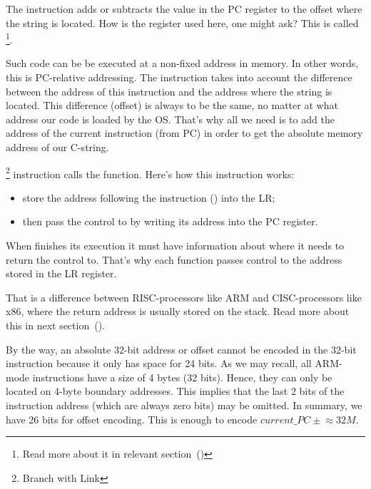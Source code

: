 \myindex{\PICcode}
The 
instruction adds or subtracts the value in the \ac{PC} register to the offset where the  string is located.
How is the  register used here, one might ask?
This is called \q{\PICcode}\footnote{Read more about it in relevant section~()}.

Such code can be be executed at a non-fixed address in memory.
In other words, this is \ac{PC}-relative addressing.
The  instruction takes into account the difference between the address of this instruction and the address where the string is located.
This difference (offset) is always to be the same, no matter at what address our code is loaded by the \ac{OS}.
That's why all we need is to add the address of the current instruction (from \ac{PC}) in order to get the absolute memory address of our C-string.

\footnote{Branch with Link} instruction calls the \printf function. 
Here's how this instruction works: 

\begin{itemize}
\item store the address following the  instruction () into the \ac{LR};
\item then pass the control to \printf by writing its address into the \ac{PC} register.
\end{itemize}

When \printf finishes its execution it must have information about where it needs to return the control to.
That's why each function passes control to the address stored in the \ac{LR} register.

That is a difference between  \ac{RISC}-processors like ARM and \ac{CISC}-processors like x86,
where the return address is usually stored on the stack.
Read more about this in next section~().

By the way, an absolute 32-bit address or offset cannot be encoded in the 32-bit  instruction because
it only has space for 24 bits.
As we may recall, all ARM-mode instructions have a size of 4 bytes (32 bits).
Hence, they can only be located on 4-byte boundary addresses.
This implies that the last 2 bits of the instruction address (which are always zero bits) may be omitted.
In summary, we have 26 bits for offset encoding. This is enough to encode $current\_PC \pm{} \approx{}32M$.

